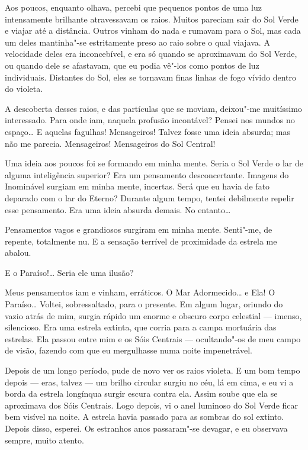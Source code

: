 Aos poucos, enquanto olhava, percebi que pequenos pontos de uma luz intensamente brilhante atravessavam os raios.
Muitos pareciam sair do Sol Verde e viajar até a distância. Outros vinham do nada e rumavam para o Sol, mas cada um
deles mantinha"-se estritamente preso ao raio sobre o qual viajava. A velocidade deles era inconcebível, e era só quando
se aproximavam do Sol Verde, ou quando dele se afastavam, que eu podia vê"-los como pontos de luz individuais. Distantes
do Sol, eles se tornavam finas linhas de fogo vívido dentro do violeta.

A descoberta desses raios, e das partículas que se moviam, deixou"-me muitíssimo interessado. Para onde iam, naquela
profusão incontável? Pensei nos mundos no espaço\ldots{} E aquelas fagulhas! Mensageiros! Talvez fosse uma ideia absurda;
mas não me parecia. Mensageiros! Mensageiros do Sol Central!

Uma ideia aos poucos foi se formando em minha mente. Seria o Sol Verde o lar de alguma inteligência superior? Era um
pensamento desconcertante. Imagens do Inominável surgiam em minha mente, incertas. Será que eu havia de fato
deparado com o lar do Eterno? Durante algum tempo, tentei debilmente repelir esse pensamento. Era uma ideia absurda
demais. No entanto\ldots{}

Pensamentos vagos e grandiosos surgiram em minha mente. Senti"-me, de repente, totalmente nu. E a sensação terrível de
proximidade da estrela me abalou.

E o Paraíso!\ldots{} Seria ele uma ilusão?

Meus pensamentos iam e vinham, erráticos. O Mar Adormecido\ldots{} e Ela! O Paraíso\ldots{} Voltei, sobressaltado, para o
presente. Em algum lugar, oriundo do vazio atrás de mim, surgia rápido um enorme e obscuro corpo celestial --- imenso,
silencioso. Era uma estrela extinta, que corria para a campa mortuária das estrelas. Ela passou entre mim e os Sóis
Centrais --- ocultando"-os de meu campo de visão, fazendo com que eu mergulhasse numa noite impenetrável.

Depois de um longo período, pude de novo ver os raios violeta. E um bom tempo depois --- eras, talvez --- um brilho
circular surgiu no céu, lá em cima, e eu vi a borda da estrela longínqua surgir escura contra ela. Assim soube que
ela se aproximava dos Sóis Centrais. Logo depois, vi o anel luminoso do Sol Verde ficar bem visível na noite. A estrela
havia passado para as sombras do sol extinto. Depois disso, esperei. Os estranhos anos passaram"-se devagar, e eu
observava sempre, muito atento.

